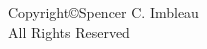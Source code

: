 \vspace*{\fill}
\begin{center}
    Copyright\copyright Spencer C. Imbleau \the\year{}\\
    All Rights Reserved
\end{center}
\vspace*{\fill}

\thispagestyle{empty}
\clearpage